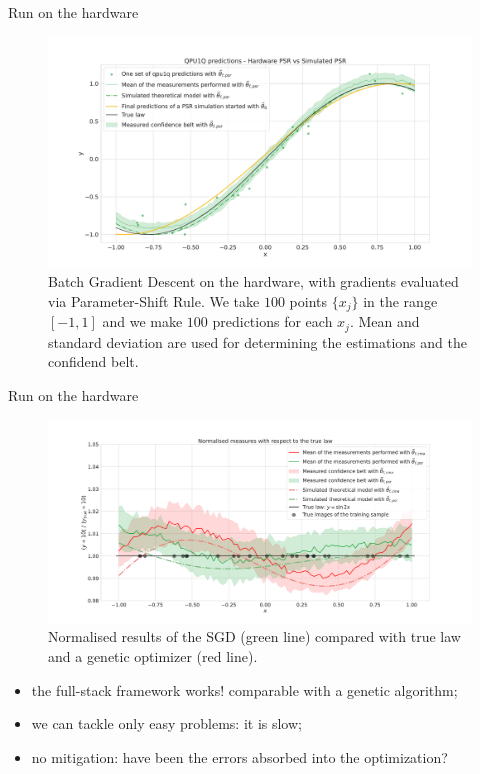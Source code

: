 \documentclass[9pt, xcolor={svgnames}, hyperref={colorlinks, linkcolor=black, citecolor=amethyst, urlcolor=amethyst}]{beamer}
\begin{document}
\begin{frame}{Run on the hardware}
\small

    \begin{figure}  
    \includegraphics[width=1\textwidth]{figures/qpu1.pdf}
    \caption{Batch Gradient Descent on the hardware, with gradients evaluated 
    via Parameter-Shift Rule. We take $100$ points $\{x_j\}$ in the range $[-1,1]$ and we make 
    $100$ predictions for each $x_j$. Mean and standard deviation are used for 
    determining the estimations and the confidend belt.}
    \end{figure}

\end{frame}

\begin{frame}{Run on the hardware}
\small

    \begin{figure}  
    \includegraphics[width=1\textwidth]{figures/ratio_plot.pdf}
    \caption{Normalised results of the SGD (green line) compared with true law 
    and a genetic optimizer (red line).}
    \end{figure}

    \pause
    \begin{itemize}[noitemsep]
    \item[\faThumbsUp] the full-stack framework works! comparable with a genetic algorithm;
    \pause
    \item[\faThumbsDown] we can tackle only easy problems: it is slow;
    \pause
    \item[\faMehO] no mitigation: have been the errors absorbed into the optimization?
    \end{itemize}

\end{frame}
\end{document}
